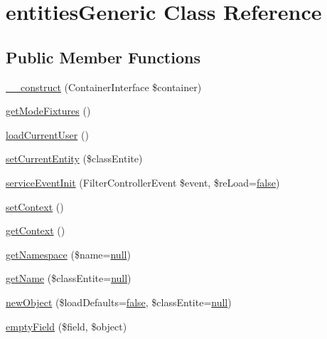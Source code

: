 \hypertarget{classentities_generic}{\section{entities\+Generic Class Reference}
\label{classentities_generic}
}
\subsection*{Public Member Functions}
\begin{DoxyCompactItemize}
\item 
\hyperlink{classentities_generic_a6835aa5d955468f64ca535359571aa56}{\+\_\+\+\_\+construct} (Container\+Interface \$container)
\item 
\hyperlink{classentities_generic_a508d6ce3541d993a44ad10a658d2482a}{get\+Mode\+Fixtures} ()
\item 
\hyperlink{classentities_generic_ad269430de95f94076286f1aacabca3d6}{load\+Current\+User} ()
\item 
\hyperlink{classentities_generic_a9a6151c6d4e5acbec75dc9bf82dc01bd}{set\+Current\+Entity} (\$class\+Entite)
\item 
\hyperlink{classentities_generic_a2b98b6a522c7ddf402567ee7d7454ae5}{service\+Event\+Init} (Filter\+Controller\+Event \$event, \$re\+Load=\hyperlink{validate_8js_a5df37b7f02e5cdc7d9412b7f872b8e01}{false})
\item 
\hyperlink{classentities_generic_aff71d05c39aae4742b5bc1d83c1e8e6e}{set\+Context} ()
\item 
\hyperlink{classentities_generic_a9cb26003187ab32716c3795c12e1d963}{get\+Context} ()
\item 
\hyperlink{classentities_generic_a7faecc73d7a13f76be585332dd8afe8e}{get\+Namespace} (\$name=\hyperlink{validate_8js_afb8e110345c45e74478894341ab6b28e}{null})
\item 
\hyperlink{classentities_generic_a429bfe8664ce0e8e9f995239b25036df}{get\+Name} (\$class\+Entite=\hyperlink{validate_8js_afb8e110345c45e74478894341ab6b28e}{null})
\item 
\hyperlink{classentities_generic_a9faea81ec9af97ef036f3fe13586efa3}{new\+Object} (\$load\+Defaults=\hyperlink{validate_8js_a5df37b7f02e5cdc7d9412b7f872b8e01}{false}, \$class\+Entite=\hyperlink{validate_8js_afb8e110345c45e74478894341ab6b28e}{null})
\item 
\hyperlink{classentities_generic_af926fba5853810c3192c7f1cb7213307}{empty\+Field} (\$field, \$object)
\item 

\end{DoxyCompactItemize}
